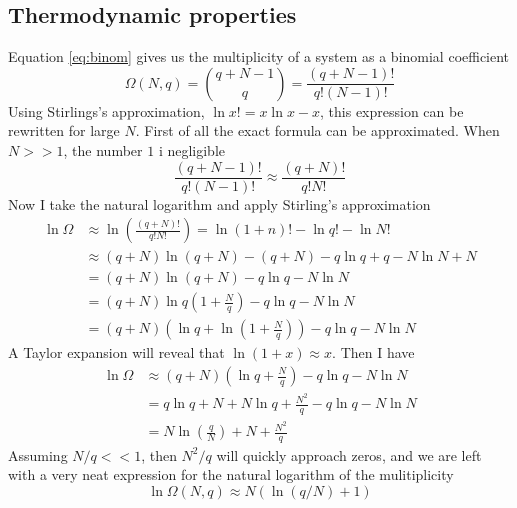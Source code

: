 \documentclass[10pt,a4paper]{amsart}
\begin{document}
\subsection{Thermodynamic properties}
Equation \ref{eq:binom} gives us the multiplicity of a system as a binomial coefficient
\begin{equation*}
\Omega(N,q)=\binom{q+N-1}{q}=\frac{(q+N-1)!}{q!(N-1)!}
\end{equation*}
Using Stirlings's approximation, $\ln x!=x\ln x-x$, this expression can be rewritten for large $N$. First of all the exact formula can be approximated. When $N>>1$, the number $1$ i negligible
\begin{equation}
\frac{(q+N-1)!}{q!(N-1)!} \approx \frac{(q+N)!}{q!N!}
\end{equation}
Now I take the natural logarithm and apply Stirling's approximation
\begin{align}
\ln \Omega &\approx \ln \left(\frac{(q+N)!}{q!N!}\right) = \ln (1+n)! - \ln q! - \ln N! \\
& \approx (q+N)\ln (q+N)-(q+N) - q \ln q +q - N \ln N +N \\
&= (q+N) \ln (q+N) - q \ln q - N \ln N \\
&= (q+N) \ln q(1+\frac{N}{q}) - q \ln q - N \ln N \\                                                                                                                                                                                                                                                                                                                                                                                                       
&= (q+N) (\ln q + \ln(1+\frac{N}{q})) - q \ln q - N \ln N                                                                                                                                                                                                                                                                                                                                                                                                       
\end{align}
A Taylor expansion will reveal that $\ln (1+x) \approx x$. Then I have
\begin{align*}
\ln \Omega &\approx (q+N) (\ln q + \frac{N}{q}) - q \ln q - N \ln N\\
&= q\ln q + N + N \ln q + \frac{N^2}{q} - q\ln q - N\ln N \\
&= N \ln \left(\frac{q}{N}\right) +N + \frac{N^2}{q} 
\end{align*}
Assuming $N/q << 1$, then $N^2/q$ will quickly approach zeros, and we are left with a very neat expression for the natural logarithm of the mulitiplicity
\begin{equation}
\label{eq:lnmulti}
\ln \Omega (N,q) \approx N(\ln (q/N) +1)
\end{equation}
\end{document}
